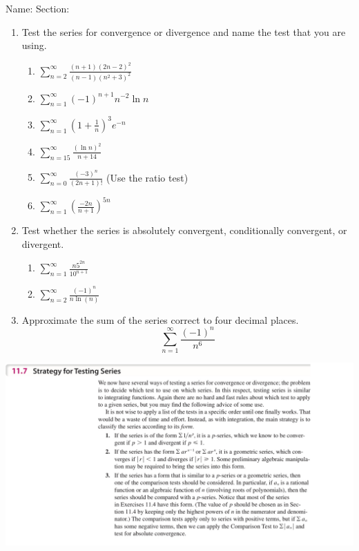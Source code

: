 \documentclass[12pt]{article}
\begin{document}
\noindent Name: \hspace{4in}Section:
\vspace{0.5cm}



\begin{enumerate}
\item Test the series for convergence or divergence and name the test that you are using.
\begin{enumerate}
\item $\sum_{n=2}^{\infty}\frac{(n+1)(2n-2)^2}{(n-1)(n^2+3)^2}$
\vfill

\item $\sum_{n=1}^\infty (-1)^{n+1} n^{-2}\ln{n} $
\vfill
\item $\sum_{n=1}^\infty\left(1+\frac{1}{n}\right)^3e^{-n}$
\vfill
\item $\sum_{n=15}^{\infty} \frac{(\ln{n})^2}{n+14}$
\vfill



\newpage
\item $\sum_{n=0}^{\infty}\frac{(-3)^n}{(2n+1)!}$ (Use the ratio test)
\vfill
\item $\sum_{n=1}^{\infty}\left( \frac{-2n}{n+1}\right)^{5n}$

\vfill
\end{enumerate}
\item Test whether the series is absolutely convergent, conditionally convergent, or divergent.
\begin{enumerate}
\item $\sum_{n=1}^{\infty} \frac{n5^{2n}}{10^{n+1}}$
\vfill


\item $\sum_{n=2}^{\infty}\frac{(-1)^n}{n \ln{(n)}}$
\vfill
\end{enumerate}


 

\newpage
\item Approximate the sum of the series correct to four decimal places.\\
\[\sum_{n=1}^{\infty}\frac{(-1)^n}{n^6}\]
\vfill
\end{enumerate}
\includegraphics[width=19cm]{IMG_2703.jpg}
\newpage
\end{document}
